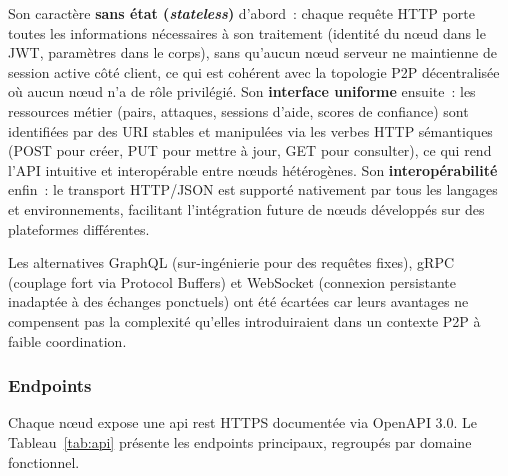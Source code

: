 Son caractère \textbf{sans état (\textit{stateless})} d'abord~: chaque requête HTTP porte toutes les informations nécessaires à son traitement (identité du nœud dans le JWT, paramètres dans le corps), sans qu'aucun nœud serveur ne maintienne de session active côté client, ce qui est cohérent avec la topologie P2P décentralisée où aucun nœud n'a de rôle privilégié. Son \textbf{interface uniforme} ensuite~: les ressources métier (pairs, attaques, sessions d'aide, scores de confiance) sont identifiées par des URI stables et manipulées via les verbes HTTP sémantiques ({POST} pour créer, {PUT} pour mettre à jour, {GET} pour consulter), ce qui rend l'API intuitive et interopérable entre nœuds hétérogènes. Son \textbf{interopérabilité} enfin~: le transport HTTP/JSON est supporté nativement par tous les langages et environnements, facilitant l'intégration future de nœuds développés sur des plateformes différentes.

Les alternatives GraphQL (sur-ingénierie pour des requêtes fixes), gRPC (couplage fort via Protocol Buffers) et WebSocket (connexion persistante inadaptée à des échanges ponctuels) ont été écartées car leurs avantages ne compensent pas la complexité qu'elles introduiraient dans un contexte P2P à faible coordination.

\subsubsection{Endpoints}

Chaque nœud expose une \gls{api} \gls{rest} HTTPS documentée via OpenAPI 3.0. Le Tableau~\ref{tab:api} présente les endpoints principaux, regroupés par domaine fonctionnel.

